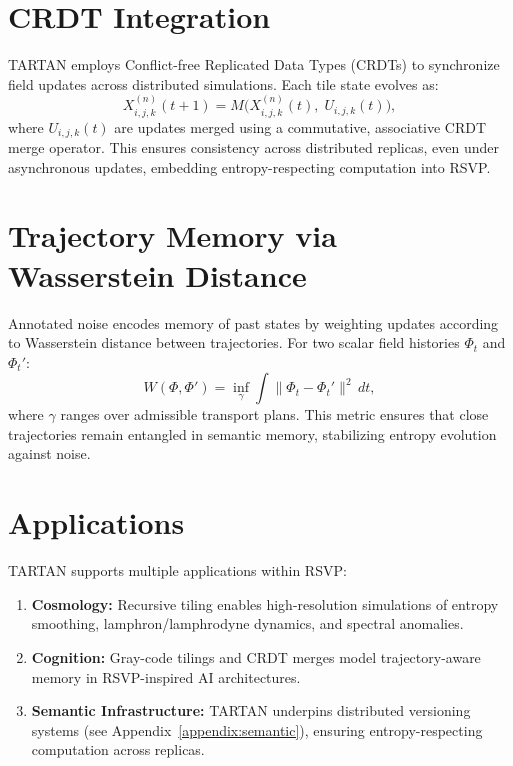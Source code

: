 \documentclass[12pt]{report}
\begin{document}
\section{CRDT Integration}

TARTAN employs Conflict-free Replicated Data Types (CRDTs) to synchronize field updates across distributed simulations. Each tile state evolves as:
\[
X^{(n)}_{i,j,k}(t+1) = M\!\big(X^{(n)}_{i,j,k}(t), \; U_{i,j,k}(t)\big),
\]
where $U_{i,j,k}(t)$ are updates merged using a commutative, associative CRDT merge operator. This ensures consistency across distributed replicas, even under asynchronous updates, embedding entropy-respecting computation into RSVP.

\section{Trajectory Memory via Wasserstein Distance}

Annotated noise encodes memory of past states by weighting updates according to Wasserstein distance between trajectories. For two scalar field histories $\Phi_t$ and $\Phi_t'$:
\begin{equation}
W(\Phi, \Phi') = \inf_{\gamma} \int \|\Phi_t - \Phi_t'\|^2 \, dt,
\label{eq:wasserstein}
\end{equation}
where $\gamma$ ranges over admissible transport plans.  
This metric ensures that close trajectories remain entangled in semantic memory, stabilizing entropy evolution against noise.

\section{Applications}

TARTAN supports multiple applications within RSVP:
\begin{enumerate}
    \item \textbf{Cosmology:} Recursive tiling enables high-resolution simulations of entropy smoothing, lamphron/lamphrodyne dynamics, and spectral anomalies.
    \item \textbf{Cognition:} Gray-code tilings and CRDT merges model trajectory-aware memory in RSVP-inspired AI architectures.
    \item \textbf{Semantic Infrastructure:} TARTAN underpins distributed versioning systems (see Appendix~\ref{appendix:semantic}), ensuring entropy-respecting computation across replicas.
\end{enumerate}
\end{document}
